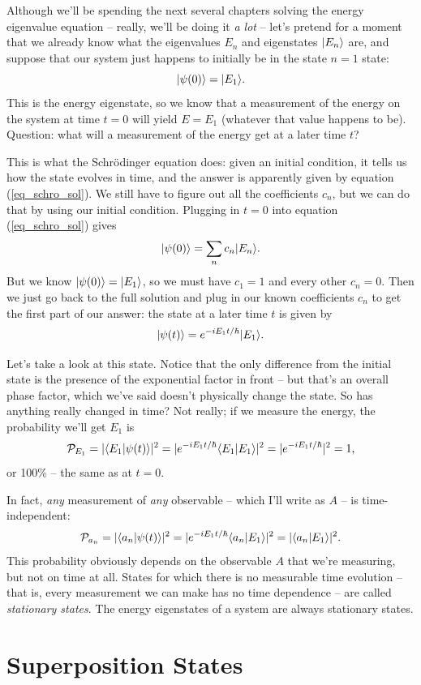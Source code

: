 Although we'll be spending the next several chapters solving the energy eigenvalue equation -- really, we'll be doing it \emph{a lot} -- let's pretend for a moment that we already know what the eigenvalues $E_n$ and eigenstates $| E_n \rangle$ are, and suppose that our system just happens to initially be in the state $n=1$ state:
\[
| \psi(0) \rangle = | E_1 \rangle.
\]
This is the energy eigenstate, so we know that a measurement of the energy on the system at time $t=0$ will yield $E = E_1$ (whatever that value happens to be). Question:  what will a measurement of the energy get at a later time $t$?

This is what the Schr\"odinger equation does:  given an initial condition, it tells us how the state evolves in time, and the answer is apparently given by equation (\ref{eq_schro_sol}).  We still have to figure out all the coefficients $c_n$, but we can do that by using our initial condition.  Plugging in $t=0$ into equation (\ref{eq_schro_sol}) gives
\[
| \psi(0) \rangle = \sum_n c_n | E_n \rangle.
\]
But we know $| \psi(0) \rangle = | E_1 \rangle$, so we must have $c_1 = 1$ and every other $c_n = 0$.  Then we just go back to the full solution and plug in our known coefficients $c_n$ to get the first part of our answer: the state at a later time $t$ is given by
\[
| \psi(t) \rangle = e^{-iE_1 t/\hbar} | E_1 \rangle.
\]

Let's take a look at this state.  Notice that the only difference from the initial state is the presence of the exponential factor in front -- but that's an overall phase factor, which we've said doesn't physically change the state.  So has anything really changed in time?  Not really; if we measure the energy, the probability we'll get $E_1$ is
\[
\mathcal{P}_{E_1} = | \langle E_1 | \psi(t) \rangle |^2 = | e^{-iE_1t/\hbar} \langle E_1 | E_1 \rangle|^2 = |e^{-iE_1t/\hbar}|^2 = 1,
\]
or 100\% -- the same as at $t=0$.  

In fact, \emph{any} measurement of \emph{any} observable -- which I'll write as $A$ -- is time-independent:
\[
\mathcal{P}_{a_n} = |\langle a_n | \psi(t) \rangle |^2 = | e^{-iE_1t/\hbar} \langle a_n | E_1 \rangle|^2 = |\langle a_n | E_1 \rangle|^2.
\]
This probability obviously depends on the observable $A$ that we're measuring, but not on time at all.  States for which there is no measurable time evolution -- that is, every measurement we can make has no time dependence -- are called \emph{stationary states}.  The energy eigenstates of a system are always stationary states.

\section{Superposition States}

